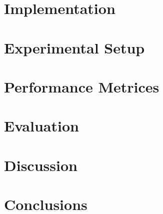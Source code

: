 \documentclass[12pt,a4paper]{article}
\begin{document}
\section{Implementation}
\section{Experimental Setup}
\section{Performance Metrices}
\section{Evaluation}
\section{Discussion}
\section{Conclusions}



\end{document}

